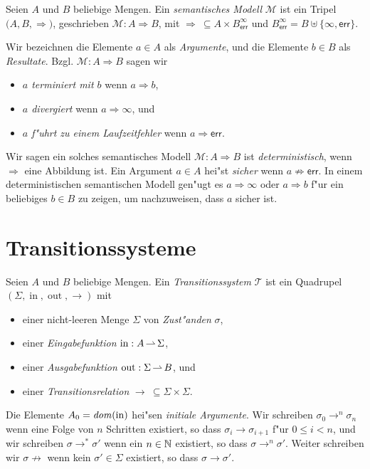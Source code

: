 \documentclass[12pt,a4paper,final]{article}
\begin{document}
\begin{definition}
  Seien $A$ und $B$ beliebige Mengen.
  Ein \emph{semantisches Modell} $\mathcal{M}$ ist ein Tripel $\bigl(A, B, \Rightarrow\bigr)$,
  geschrieben $\mathcal{M}: A \Rightarrow B$, mit \mbox{$\Rightarrow\ \subseteq A \times B^\infty_{\mathsf{err}}$}
  und $B^\infty_{\mathsf{err}} = B \uplus \{\infty,\mathsf{err}\}$.
\end{definition}
Wir bezeichnen die Elemente $a \in A$ als \emph{Argumente}, und die Elemente $b \in B$
als \emph{Resultate}. Bzgl. $\mathcal{M}: A \Rightarrow B$ sagen wir
\begin{itemize}
\item \emph{$a$ terminiert mit $b$} wenn $a \Rightarrow b$,
\item \emph{$a$ divergiert} wenn $a \Rightarrow \infty$, und
\item \emph{$a$ f"uhrt zu einem Laufzeitfehler} wenn $a \Rightarrow \mathsf{err}$.
\end{itemize}
Wir sagen ein solches semantisches Modell \mbox{$\mathcal{M}: A \Rightarrow B$} ist \emph{deterministisch},
wenn $\Rightarrow$ eine Abbildung ist. Ein Argument \mbox{$a \in A$} hei"st \emph{sicher} wenn
\mbox{$a \not\Rightarrow \mathsf{err}$}. In einem deterministischen semantischen Modell gen"ugt es
\mbox{$a \Rightarrow \infty$} oder \mbox{$a \Rightarrow b$} f"ur ein beliebiges \mbox{$b \in B$} zu zeigen,
um nachzuweisen, dass $a$ sicher ist.



\section{Transitionssysteme}
\label{sec:Transitionssysteme}

\begin{definition}[Transitionssystem]
  Seien $A$ und $B$ beliebige Mengen.
  Ein \emph{Transitionssystem} $\mathcal{T}$ ist ein Quadrupel \mbox{$(\Sigma,\operatorname{in},\operatorname{out},\rightarrow)$} mit
  \begin{itemize}
  \item einer nicht-leeren Menge $\Sigma$ von \emph{Zust"anden} $\sigma$,
  \item einer \emph{Eingabefunktion} \mbox{$\operatorname{in}:A \operatorname{\rightharpoonup} \Sigma$},
  \item einer \emph{Ausgabefunktion} \mbox{$\operatorname{out}:\Sigma \operatorname{\rightharpoonup} B$}, und
  \item einer \emph{Transitionsrelation} $\rightarrow\ \subseteq \Sigma \times \Sigma$.
  \end{itemize}
\end{definition}
Die Elemente $A_0 = \operatorname{\mathit{dom}}(\operatorname{in})$ hei"sen \emph{initiale Argumente}. Wir schreiben
\mbox{$\sigma_0 \rightarrow^n \sigma_n$} wenn eine Folge von $n$ Schritten existiert,
so dass \mbox{$\sigma_i \rightarrow \sigma_{i+1}$} f"ur $0 \le i < n$, und wir schreiben
\mbox{$\sigma \rightarrow^* \sigma'$} wenn ein $n \in \mathbb N$ existiert, so dass
\mbox{$\sigma \rightarrow^n \sigma'$}. Weiter schreiben wir \mbox{$\sigma \not\rightarrow$}
wenn kein $\sigma' \in \Sigma$ existiert, so dass \mbox{$\sigma \rightarrow \sigma'$}.
\end{document}
